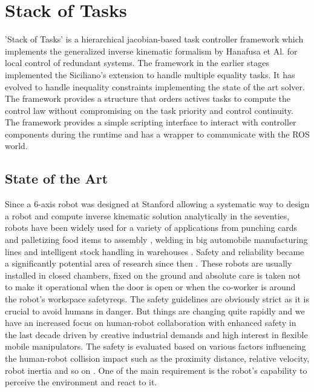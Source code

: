 \section{Stack of Tasks}
\label{subsec:sot}
'Stack of Tasks' is a hierarchical jacobian-based task controller framework which implements the generalized inverse kinematic formalism by Hanafusa et Al. for local control of redundant systems\cite{hanafusa1981analysis}\cite{Mansard2009ik}. The framework in the earlier stages implemented the Siciliano's extension to handle multiple equality tasks\cite{siciliano1991general}. It has evolved to handle inequality constraints implementing the state of the art solver. The framework provides a structure that orders actives tasks to compute the control law without compromising on the task priority and control continuity. The framework provides a simple scripting interface to interact with controller components during the runtime and has a wrapper to communicate with the ROS world.
\subsection{State of the Art}
Since a 6-axis robot was designed at Stanford allowing a systematic way to design a robot and compute inverse kinematic solution analytically in the seventies, robots have been widely used for a variety of applications from punching cards and palletizing food items to assembly , welding in big automobile manufacturing lines and intelligent stock handling in warehouses \cite{scheinman1969design}. Safety and reliability became a significantly potential area of research since then \cite{dhillon2012robot}. These robots are usually installed in closed chambers, fixed on the ground and absolute care is taken not to make it operational when the door is open or when the co-worker is around the robot’s workspace {safetyreqs}. The safety guidelines are obviously strict as it is crucial to avoid humans in danger. But things are changing quite rapidly and we have an increased focus on human-robot collaboration with enhanced safety in the last decade \cite{Bicchi2008,dhillon2012robot} driven by creative industrial demands and high interest in flexible mobile manipulators. The safety is evaluated based on various factors influencing the human-robot collision impact such as the proximity distance, relative velocity, robot inertia and so on \cite{Kulic2006}. One of the main requirement is the robot’s capability to perceive the environment and react to it.



